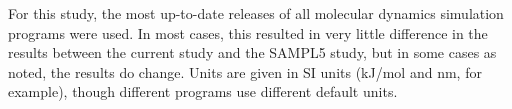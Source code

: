 
For this study, the most up-to-date releases of all molecular dynamics
simulation programs were used. In most cases, this resulted in very
little difference in the results between the current study and the
SAMPL5 study, but in some cases as noted, the results do change. Units
are given in SI units (kJ/mol and nm, for example), though different
programs use different default units. 

